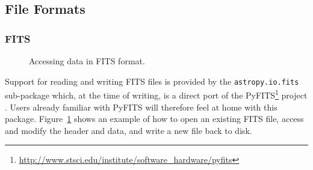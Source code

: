 \documentclass[traditabstract]{aa}
\begin{document}
\subsection{File Formats}


\subsubsection{FITS}


\label{sec:fits}

\begin{figure}
\center
\caption{Accessing data in FITS format.\label{code:fits}}
\vspace{0.1in}
\end{figure}

Support for reading and writing FITS files is provided by the
\texttt{astropy.io.fits} sub-package which, at the time of writing, is a
direct port of the
PyFITS\footnote{\url{http://www.stsci.edu/institute/software_hardware/pyfits}}
project \citep{barrett1999pyfits}. Users already familiar with PyFITS will
therefore feel at home with this package. Figure~\ref{code:fits} shows an example of how to
open an existing FITS file, access and modify the header and data, and write a new file back to disk.
\end{document}
